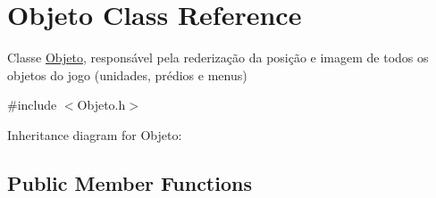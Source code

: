 \hypertarget{classObjeto}{}\section{Objeto Class Reference}
\label{classObjeto}


Classe \hyperlink{classObjeto}{Objeto}, responsável pela rederização da posição e imagem de todos os objetos do jogo (unidades, prédios e menus)  




{\ttfamily \#include $<$Objeto.\+h$>$}



Inheritance diagram for Objeto\+:
\subsection*{Public Member Functions}
